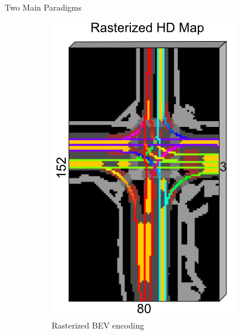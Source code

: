 \documentclass[10pt,aspectratio=169]{beamer}
\begin{document}
\begin{frame}{Two Main Paradigms}
\begin{figure}[H]
\centering
\begin{subfigure}[t]{0.35\textwidth}
    \centering
    \includegraphics[width=\textwidth]{docs/latex/figures/caspnet-bev-repr.png}
    \caption{Rasterized BEV encoding}
    \label{fig:rasterized}
\end{subfigure}
\hfill
\begin{subfigure}[t]{0.37\textwidth}
    \centering

\end{subfigure}
\end{figure}
\end{frame}
\end{document}
